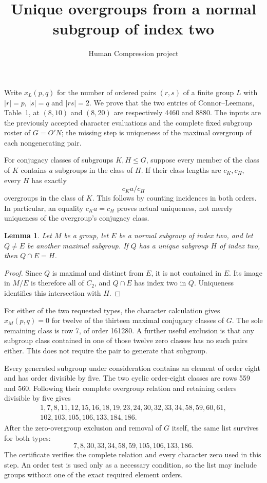 \documentclass[11pt,a4paper]{article}
\title{Unique overgroups from a normal subgroup of index two}
\author{Human Compression project}\date{}
\newtheorem{lemma}{Lemma}
\begin{document}
\maketitle
Write $x_L(p,q)$ for the number of ordered pairs $(r,s)$ of a finite
group $L$ with $|r|=p$, $|s|=q$ and $|rs|=2$. We prove that the
two entries of Connor--Leemans, Table~1, at $(8,10)$ and $(8,20)$
are respectively 4460 and 8880. The inputs are the previously
accepted character evaluations and the complete fixed subgroup
roster of $G=O'N$; the missing step is uniqueness of the maximal
overgroup of each nongenerating pair.

For conjugacy classes of subgroups $K,H\leq G$, suppose every
member of the class of $K$ contains $a$ subgroups in the class of $H$.
If their class lengths are $c_K,c_H$, every $H$ has exactly
\[
                         c_Ka/c_H                           \tag{1}
\]
overgroups in the class of $K$. This follows by counting incidences
in both orders. In particular, an equality $c_Ka=c_H$ proves actual
uniqueness, not merely uniqueness of the overgroup's conjugacy class.

\begin{lemma}\label{square}
Let $M$ be a group, let $E$ be a normal subgroup of index two,
and let $Q\neq E$ be another maximal subgroup. If $Q$ has a unique
subgroup $H$ of index two, then $Q\cap E=H$.
\end{lemma}
\begin{proof}
Since $Q$ is maximal and distinct from $E$, it is not contained
in $E$. Its image in $M/E$ is therefore all of $C_2$, and $Q\cap E$
has index two in $Q$. Uniqueness identifies this intersection with $H$.
\end{proof}

For either of the two requested types, the character calculation
gives $x_M(p,q)=0$ for twelve of the thirteen maximal conjugacy
classes of $G$. The sole remaining class is row 7, of order 161280.
A further useful exclusion is that any subgroup class contained in
one of those twelve zero classes has no such pairs either. This
does not require the pair to generate that subgroup.

Every generated subgroup under consideration contains an element
of order eight and has order divisible by five. The two cyclic
order-eight classes are rows 559 and 560. Following their complete
overgroup relation and retaining orders divisible by five gives
\[
\begin{split}
1,7,8,11,12,15,16,18,19,23,24,30,32,33,34,58,59,60,61,\\
102,103,105,106,133,184,186.
\end{split}                                                   \tag{2}
\]
After the zero-overgroup exclusion and removal of $G$ itself, the
same list survives for both types:
\[
                  7,8,30,33,34,58,59,105,106,133,186.          \tag{3}
\]
The certificate verifies the complete relation and every character
zero used in this step. An order test is used only as a necessary
condition, so the list may include groups without one of the exact
required element orders.
\end{document}
